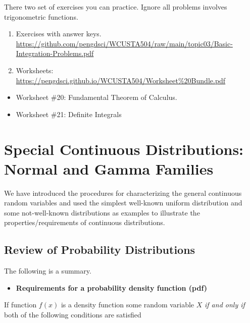 \documentclass[
]{book}
\providecommand{\tightlist}{%
  \setlength{\itemsep}{0pt}\setlength{\parskip}{0pt}}
\begin{document}
There two set of exercises you can practice. Ignore all problems involves trigonometric functions.

\begin{enumerate}
\def\labelenumi{\arabic{enumi}.}
\item
  Exercises with answer keys. \url{https://github.com/pengdsci/WCUSTA504/raw/main/topic03/Basic-Integration-Problems.pdf}
\item
  Worksheets: \url{https://pengdsci.github.io/WCUSTA504/Worksheet\%20Bundle.pdf}
\end{enumerate}

\begin{itemize}
\item
  Worksheet \#20: Fundamental Theorem of Calculus.
\item
  Worksheet \#21: Definite Integrals
\end{itemize}

\hfill\break

\hfill\break

\hypertarget{special-continuous-distributions-normal-and-gamma-families}{%
\chapter{Special Continuous Distributions: Normal and Gamma Families}\label{special-continuous-distributions-normal-and-gamma-families}}

We have introduced the procedures for characterizing the general continuous random variables and used the simplest well-known uniform distribution and some not-well-known distributions as examples to illustrate the properties/requirements of continuous distributions.

\hypertarget{review-of-probability-distributions}{%
\section{Review of Probability Distributions}\label{review-of-probability-distributions}}

The following is a summary.

\begin{itemize}
\tightlist
\item
  \textbf{Requirements for a probability density function (pdf)}
\end{itemize}

If function \(f(x)\) is a density function some random variable \(X\) \emph{if and only if} both of the following conditions are satisfied
\end{document}

